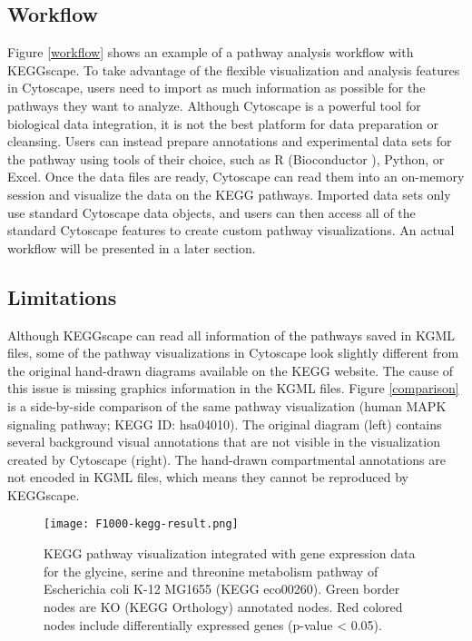 \documentclass[10pt,a4paper,twocolumn]{article}
\begin{document}
\subsection*{Workflow}
Figure \ref{workflow} shows an example of a pathway analysis workflow with KEGGscape. To take advantage of the flexible visualization and analysis features in Cytoscape, users need to import as much information as possible for the pathways they want to analyze.  Although Cytoscape is a powerful tool for biological data integration, it is not the best platform for data preparation or cleansing. Users can instead prepare annotations and experimental data sets for the pathway using tools of their choice, such as R (Bioconductor \cite{gentleman2004bioconductor}), Python, or Excel. Once the data files are ready, Cytoscape can read them into an on-memory session and visualize the data on the KEGG pathways.  Imported data sets only use standard Cytoscape data objects, and users can then access all of the standard Cytoscape features to create custom pathway visualizations.  An actual workflow will be presented in a later section.

\subsection*{Limitations}
Although KEGGscape can read all information of the pathways saved in KGML files, some of the pathway visualizations in Cytoscape look slightly different from the original hand-drawn diagrams available on the KEGG website.  The cause of this issue is missing graphics information in the KGML files.  Figure \ref{comparison} is a side-by-side comparison of the same pathway visualization (human MAPK signaling pathway; KEGG ID: hsa04010). The original diagram (left) contains several background visual annotations that are not visible in the visualization created by Cytoscape (right). The hand-drawn compartmental annotations are not encoded in KGML files, which means they cannot be reproduced by KEGGscape.

\begin{figure*}[htb]
\centering
\texttt{[image: F1000-kegg-result.png]}
\caption{KEGG pathway visualization integrated with gene expression data for the glycine, serine and threonine metabolism pathway of Escherichia coli K-12 MG1655 (KEGG eco00260). Green border nodes are KO (KEGG Orthology) annotated nodes. Red colored nodes include differentially expressed genes (p-value < 0.05).}
\label{result}
\end{figure*}
\end{document}
